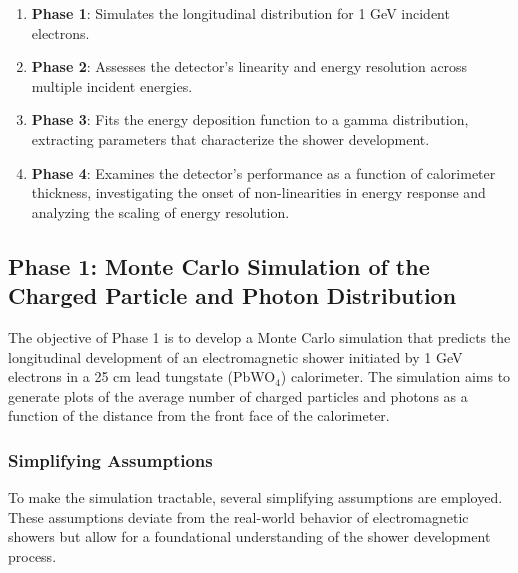 \documentclass[twocolumn]{aastex631}
\begin{document}
\begin{enumerate}
    \item \textbf{Phase 1}: Simulates the longitudinal distribution for 1 GeV incident electrons.
    \item \textbf{Phase 2}: Assesses the detector's linearity and energy resolution across multiple incident energies.
    \item \textbf{Phase 3}: Fits the energy deposition function to a gamma distribution, extracting parameters that characterize the shower development.
    \item \textbf{Phase 4}: Examines the detector's performance as a function of calorimeter thickness, investigating the onset of non-linearities in energy response and analyzing the scaling of energy resolution.
\end{enumerate}

\subsection{Phase 1: Monte Carlo Simulation of the Charged Particle and Photon Distribution}

The objective of Phase 1 is to develop a Monte Carlo simulation that predicts the longitudinal development of an electromagnetic shower initiated by 1 GeV electrons in a 25 cm lead tungstate (PbWO\(_4\)) calorimeter. The simulation aims to generate plots of the average number of charged particles and photons as a function of the distance from the front face of the calorimeter.

\subsubsection{Simplifying Assumptions}

To make the simulation tractable, several simplifying assumptions are employed. These assumptions deviate from the real-world behavior of electromagnetic showers but allow for a foundational understanding of the shower development process.
\end{document}
